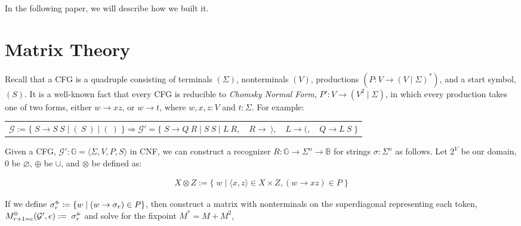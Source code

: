 \documentclass[sigplan,review,anonymous,acmsmall]{acmart}\settopmatter{printfolios=false,printccs=false,printacmref=false}
\begin{document}
\noindent In the following paper, we will describe how we built it.

\section{Matrix Theory}\label{sec:matrix}

Recall that a CFG is a quadruple consisting of terminals $(\Sigma)$, nonterminals $(V)$, productions $(P\colon V \rightarrow (V \mid \Sigma)^*)$, and a start symbol, $(S)$. It is a well-known fact that every CFG is reducible to \textit{Chomsky Normal Form}, $P'\colon V \rightarrow (V^2 \mid \Sigma)$, in which every production takes one of two forms, either $w \rightarrow xz$, or $w \rightarrow t$, where $w, x, z: V$ and $t: \Sigma$. For example:\vspace{-3pt}

\begin{table}[H]
\begin{tabular}{llll}
$\mathcal{G}:=\big\{\;S \rightarrow S\:S \mid (\:S\:) \mid (\:)\;\big\} \Longrightarrow \mathcal{G}'=\big\{\;S\rightarrow Q\:R \mid S\:S \mid L\:R,$ & $R \rightarrow\:),$ & $L \rightarrow (,$ & $Q\rightarrow L\:S\;\big\}$
\end{tabular}
\end{table}\vspace{-8pt}

\noindent Given a CFG, $\mathcal{G}' : \mathbb{G} = \langle \Sigma, V, P, S\rangle$ in CNF, we can construct a recognizer $R: \mathbb{G} \rightarrow \Sigma^n \rightarrow \mathbb{B}$ for strings $\sigma: \Sigma^n$ as follows. Let $2^V$ be our domain, $0$ be $\varnothing$, $\oplus$ be $\cup$, and $\otimes$ be defined as:\vspace{-10pt}

\begin{align}
X \otimes Z := \big\{\;w \mid \langle x, z\rangle \in X \times Z, (w\rightarrow xz) \in P\;\big\}
\end{align}

\noindent If we define $\sigma_r^{\shortuparrow\hspace{-5pt}\shortrightarrow} \coloneqq \{w \mid (w \rightarrow \sigma_r) \in P\}$, then construct a matrix with nonterminals on the superdiagonal representing each token, $M^0_{r+1=c}(\mathcal{G}', e) := \;\sigma_r^{\shortuparrow\hspace{-5pt}\shortrightarrow}$ and solve for the fixpoint $M^* = M + M^2$,\vspace{-10pt}
\end{document}
